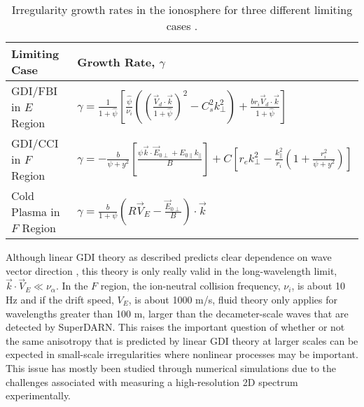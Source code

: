 
\begin{table}
\begin{tabular}{l l}
Limiting Case & Growth Rate, \(\gamma\) \\
\hline
GDI/FBI in \(E\) Region & \(\gamma = \frac{1}{1+\hat{\psi}}\left[\frac{\hat{\psi}}{\nu_i}\left(\left(\frac{\vec{V}_d\cdot \vec{k}}{1+\hat{\psi}}\right)^2-C_s^2 k_\perp^2\right)+\frac{br_i\vec{V}_d\cdot \vec{k}}{1+\hat{\psi}}\right]\) \\
GDI/CCI in \(F\) Region & \(\gamma = -\frac{b}{\psi+y^2}\left[\frac{\psi\vec{k}\cdot\vec{E}_{0\perp}+E_{0\parallel}k_\parallel}{B}\right]+C\left[r_ek_\perp^2-\frac{k_\parallel^2}{r_i}\left(1+\frac{r_i^2}{\psi+y^2}\right)\right]\) \\
Cold Plasma in \(F\) Region & \(\gamma = \frac{b}{1+\psi}\left(R\vec{V}_E-\frac{\vec{E}_{0\perp}}{B}\right)\cdot\vec{k}\) \\
\end{tabular}
\caption{Irregularity growth rates in the ionosphere for three different limiting cases \citep{Makarevich2016a}.}
\label{tab:gdi_exps}
\end{table}

Although linear GDI theory as described predicts clear dependence on wave vector direction \citep{Makarevich2014c}, this theory is only really valid in the long-wavelength limit, \(\vec{k}\cdot\vec{V}_E \ll \nu_\alpha\).  In the \(F\) region, the ion-neutral collision frequency, \(\nu_i\), is about 10 Hz and if the drift speed, \(V_E\), is about 1000 m/s, fluid theory only applies for wavelengths greater than 100 m, larger than the decameter-scale waves that are detected by SuperDARN.  This raises the important question of whether or not the same anisotropy that is predicted by linear GDI theory at larger scales can be expected in small-scale irregularities where nonlinear processes may be important.  This issue has mostly been studied through numerical simulations due to the challenges associated with measuring a high-resolution 2D spectrum experimentally.

